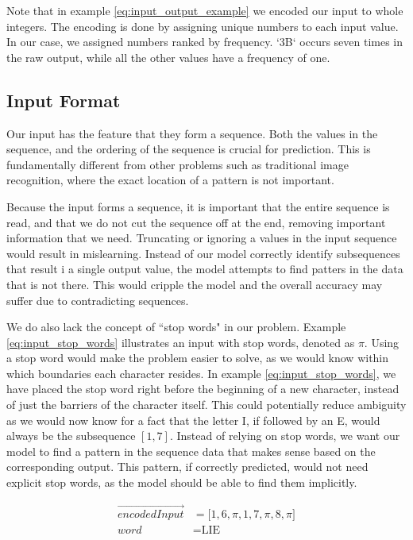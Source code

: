 Note that in example \ref{eq:input_output_example} we encoded our input to whole integers. The encoding is done by assigning unique numbers to each input value. In our case, we assigned numbers ranked by frequency. `3B` occurs seven times in the raw output, while all the other values have a frequency of one.

\subsection{Input Format}
Our input has the feature that they form a sequence. Both the values in the sequence, and the ordering of the sequence is crucial for prediction. This is fundamentally different from other problems such as traditional image recognition, where the exact location of a pattern is not important.

Because the input forms a sequence, it is important that the entire sequence is read, and that we do not cut the sequence off at the end, removing important information that we need. Truncating or ignoring a values in the input sequence would result in mislearning. Instead of our model correctly identify subsequences that result i a single output value, the model attempts to find patters in the data that is not there. This would cripple the model and the overall accuracy may suffer due to contradicting sequences.

We do also lack the concept of ``stop words" in our problem. Example \ref{eq:input_stop_words} illustrates an input with stop words, denoted as $\pi$. Using a stop word would make the problem easier to solve, as we would know within which boundaries each character resides. In example \ref{eq:input_stop_words}, we have placed the stop word right before the beginning of a new character, instead of just the barriers of the character itself. This could potentially reduce ambiguity as we would now know for a fact that the letter I, if followed by an E, would always be the subsequence $[1, 7]$. Instead of relying on stop words, we want our model to find a pattern in the sequence data that makes sense based on the corresponding output. This pattern, if correctly predicted,
would not need explicit stop words, as the model should be able to find them implicitly.

\begin{equation}
    \label{eq:input_stop_words}
    \begin{aligned}
       \vec{encodedInput}        &= \lbrack 1, 6, \pi, 1, 7, \pi, 8, \pi \rbrack \\
       word                      &= \text{LIE}
    \end{aligned}
\end{equation}

